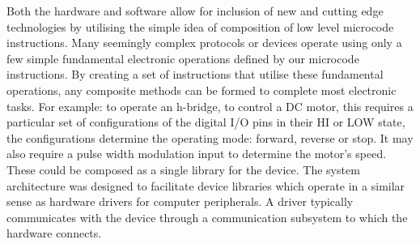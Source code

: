     
	Both the hardware and software allow for inclusion of new and cutting edge technologies by utilising the simple idea of composition of low level microcode instructions. Many seemingly complex protocols or devices operate using only a few simple fundamental electronic operations defined by our microcode instructions. By creating a set of instructions that utilise these fundamental operations, any composite methods can be formed to complete most electronic tasks. For example: to operate an h-bridge, to control a DC motor, this requires a particular set of configurations of the digital I/O pins in their HI or LOW state, the configurations determine the operating mode: forward, reverse or stop. It may also require a pulse width modulation input to determine the motor's speed. These could be composed as a single library for the device. The \xten system architecture was designed to facilitate device libraries which operate in a similar sense as hardware drivers for computer peripherals. A driver typically communicates with the device through a communication subsystem to which the hardware connects.	
	
	
	
	
